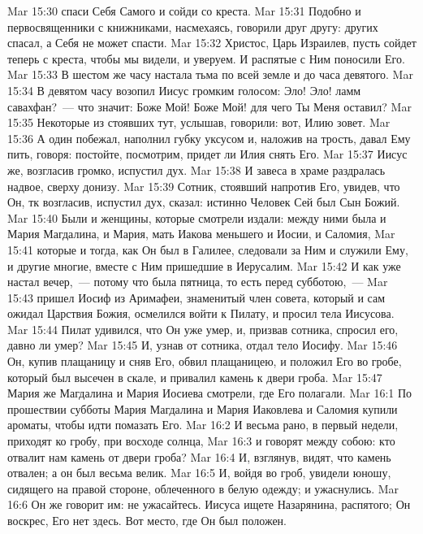 \vs Mar 15:30 спаси Себя Самого и сойди со креста.
\vs Mar 15:31 Подобно и первосвященники с книжниками, насмехаясь, говорили друг другу: других спасал, а Себя не может спасти.
\vs Mar 15:32 Христос, Царь Израилев, пусть сойдет теперь с креста, чтобы мы видели, и уверуем. И распятые с Ним поносили Его.
\rsbpar\vs Mar 15:33 В шестом же часу настала тьма по всей земле и  до часа девятого.
\vs Mar 15:34 В девятом часу возопил Иисус громким голосом: Эло! Эло! ламм савахфан?~--- что значит: Боже Мой! Боже Мой! для чего Ты Меня оставил?
\vs Mar 15:35 Некоторые из стоявших тут, услышав, говорили: вот, Илию зовет.
\vs Mar 15:36 А один побежал, наполнил губку уксусом и, наложив на трость, давал Ему пить, говоря: постойте, посмотрим, придет ли Илия снять Его.
\vs Mar 15:37 Иисус же, возгласив громко, испустил дух.
\vs Mar 15:38 И завеса в храме раздралась надвое, сверху донизу.
\vs Mar 15:39 Сотник, стоявший напротив Его, увидев, что Он, тк возгласив, испустил дух, сказал: истинно Человек Сей был Сын Божий.
\vs Mar 15:40 Были  и женщины, которые смотрели издали: между ними была и Мария Магдалина, и Мария, мать Иакова меньшего и Иосии, и Саломия,
\vs Mar 15:41 которые и тогда, как Он был в Галилее, следовали за Ним и служили Ему, и другие многие, вместе с Ним пришедшие в Иерусалим.
\rsbpar\vs Mar 15:42 И как уже настал вечер,~--- потому что была пятница, то есть  перед субботою,~---
\vs Mar 15:43 пришел Иосиф из Аримафеи, знаменитый член совета, который и сам ожидал Царствия Божия, осмелился войти к Пилату, и просил тела Иисусова.
\vs Mar 15:44 Пилат удивился, что Он уже умер, и, призвав сотника, спросил его, давно ли умер?
\vs Mar 15:45 И, узнав от сотника, отдал тело Иосифу.
\vs Mar 15:46 Он, купив плащаницу и сняв Его, обвил плащаницею, и положил Его во гробе, который был высечен в скале, и привалил камень к двери гроба.
\vs Mar 15:47 Мария же Магдалина и Мария Иосиева смотрели, где Его полагали.
\vs Mar 16:1 По прошествии субботы Мария Магдалина и Мария Иаковлева и Саломия купили ароматы, чтобы идти помазать Его.
\vs Mar 16:2 И весьма рано, в первый  недели, приходят ко гробу, при восходе солнца,
\vs Mar 16:3 и говорят между собою: кто отвалит нам камень от двери гроба?
\vs Mar 16:4 И, взглянув, видят, что камень отвален; а он был весьма велик.
\vs Mar 16:5 И, войдя во гроб, увидели юношу, сидящего на правой стороне, облеченного в белую одежду; и ужаснулись.
\vs Mar 16:6 Он же говорит им: не ужасайтесь. Иисуса ищете Назарянина, распятого; Он воскрес, Его нет здесь. Вот место, где Он был положен.
